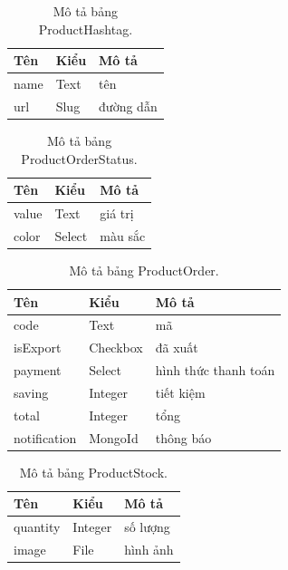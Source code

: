 \documentclass[11pt]{report}
\begin{document}
	
	\begin{table}[h!]
		\begin{center}
			\caption{Mô tả bảng ProductHashtag.}
			\begin{tabularx}{0.6\textwidth}{ |l|l|X| } 
				\hline
				Tên & Kiểu & Mô tả \\
				\hline
				name & Text & tên \\
				url & Slug & đường dẫn \\
				\hline
			\end{tabularx}
			\label{table:ProductHashtag}
		\end{center}
	\end{table}
	
	
	\begin{table}[h!]
		\begin{center}
			\caption{Mô tả bảng ProductOrderStatus.}
			\begin{tabularx}{0.6\textwidth}{ |l|l|X| } 
				\hline
				Tên & Kiểu & Mô tả \\
				\hline
				value & Text & giá trị \\
				color & Select & màu sắc \\ 
				\hline
			\end{tabularx}
			\label{table:ProductOrderStatus}
		\end{center}
	\end{table}
	
	
	\begin{table}[h!]
		\begin{center}
			\caption{Mô tả bảng ProductOrder.}
			\begin{tabularx}{0.6\textwidth}{ |l|l|X| } 
				\hline
				Tên & Kiểu & Mô tả \\
				\hline
				code & Text & mã \\
				isExport & Checkbox & đã xuất \\
				payment & Select & hình thức thanh toán \\
				saving & Integer & tiết kiệm \\
				total & Integer & tổng \\
				notification & MongoId & thông báo \\ 
				\hline
			\end{tabularx}
			\label{table:ProductOrder}
		\end{center}
	\end{table}
	
	
	\begin{table}[h!]
		\begin{center}
			\caption{Mô tả bảng ProductStock.}
			\begin{tabularx}{0.6\textwidth}{ |l|l|X| } 
				\hline
				Tên & Kiểu & Mô tả \\
				\hline
				quantity & Integer & số lượng \\
				image & File & hình ảnh \\ 
				\hline
			\end{tabularx}
			\label{table:ProductStock}
		\end{center}
	\end{table}
	
\end{document}
